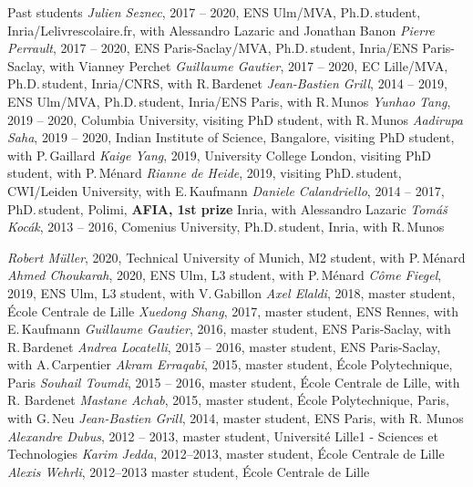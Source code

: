 \documentclass{resume}
\begin{document}
\begin{category}{Past students}
\citembullet \textit{Julien Seznec}, 2017 -- 2020, ENS Ulm/MVA, Ph.D.\,student,
Inria/Lelivrescolaire.fr, with Alessandro Lazaric and Jonathan Banon
\citembullet \textit{Pierre Perrault},  2017 -- 2020, ENS Paris-Saclay/MVA, Ph.D.\,student,
Inria/ENS Paris-Saclay, with Vianney Perchet
\citembullet \textit{Guillaume Gautier},  2017 -- 2020, EC Lille/MVA, Ph.D.\,student,
Inria/CNRS, with R.\,Bardenet
\citembullet \textit{Jean-Bastien Grill}, 2014 -- 2019, ENS Ulm/MVA, Ph.D.\,student,
Inria/ENS Paris, with R.\,Munos
\citembullet \textit{Yunhao Tang}, 2019 -- 2020, Columbia University, visiting PhD student, with R.\,Munos
\citembullet \textit{Aadirupa Saha}, 2019 -- 2020, Indian Institute of Science, Bangalore, visiting PhD student, with P.\,Gaillard
\citembullet \textit{Kaige Yang}, 2019, University College London, visiting PhD student, with P.\,M\'enard
\citembullet \textit{Rianne de Heide}, 2019, visiting PhD.\,student, CWI/Leiden University, with E.\,Kaufmann
\citembullet \textit{Daniele Calandriello}, 2014 -- 2017, PhD.\,student, Polimi, \textbf{AFIA, 1st prize}
Inria, with Alessandro Lazaric
\citembullet \textit{Tom\'a\v s Koc\' ak}, 2013 -- 2016, Comenius University, Ph.D.\,student,
Inria, with R.\,Munos

\citembullet  \emph{Robert M\"uller}, 2020, Technical University of Munich, M2 student, with P.\,M\'enard
\citembullet  \emph{Ahmed Choukarah}, 2020, ENS Ulm, L3 student, with P.\,M\'enard
\citembullet  \emph{C\^{o}me Fiegel}, 2019, ENS Ulm, L3 student, with V.\,Gabillon
\citembullet \textit{Axel Elaldi}, 2018, master student, 
\'Ecole Centrale de Lille
\citembullet \textit{Xuedong Shang}, 2017, master student, 
ENS Rennes, with E.\,Kaufmann
\citembullet \textit{Guillaume Gautier}, 2016, master student, 
ENS Paris-Saclay, with R.\,Bardenet
\citembullet \textit{Andrea Locatelli}, 2015 -- 2016, master student,
ENS Paris-Saclay, with A.\,Carpentier 
\citembullet \textit{Akram Erraqabi}, 2015, master student,
\'Ecole Polytechnique, Paris 
\citembullet \textit{Souhail Toumdi}, 2015 -- 2016, master student, \'Ecole
Centrale de Lille,  with R. Bardenet
\citembullet \textit{Mastane Achab}, 2015, master student,
\'Ecole Polytechnique, Paris, with G.\,Neu
\citembullet \textit{Jean-Bastien Grill}, 2014, master student,
ENS Paris, with R. Munos
\citembullet \textit{Alexandre Dubus}, 2012 -- 2013, master student, Universit\'e
Lille1 -
Sciences et Technologies
\citembullet \textit{Karim Jedda},  2012--2013, master student, \'Ecole
Centrale de Lille
  \citembullet \textit{Alexis Wehrli}, 2012--2013 master student, \'Ecole
Centrale de Lille
\end{category}
\end{document}
